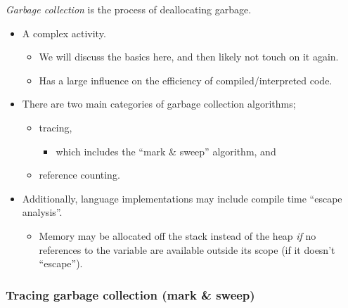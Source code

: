 \documentclass[11pt]{article}
\theoremstyle{definition}
\begin{document}
\emph{Garbage collection} is the process of deallocating garbage.
\begin{itemize}
\item A complex activity.
\begin{itemize}
\item We will discuss the basics here, and then likely not
touch on it again.
\item Has a large influence on the efficiency of
compiled/interpreted code.
\end{itemize}
\item There are two main categories of garbage collection algorithms;
\begin{itemize}
\item tracing,
\begin{itemize}
\item which includes the “mark \& sweep” algorithm, and
\end{itemize}
\item reference counting.
\end{itemize}
\item Additionally, language implementations may include compile time
“escape analysis”.
\begin{itemize}
\item Memory may be allocated off the stack instead of the heap
\emph{if} no references to the variable are available outside its scope
(if it doesn't “escape”).
\end{itemize}
\end{itemize}

\subsubsection{Tracing garbage collection (mark \& sweep)}
\label{sec:orgd7a3c6f}
\end{document}
